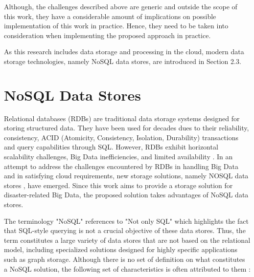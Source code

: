 Although, the challenges described above are generic and outside the scope of this work, they have a considerable amount of implications on possible implementation of this work in practice. Hence, they need to be taken into consideration when implementing the proposed approach in practice.

As this research includes data storage and processing in the cloud, modern data storage technologies, namely NoSQL data stores, are introduced in Section 2.3.

\section{NoSQL Data Stores}

Relational databases (RDBs) are traditional data storage systems designed for storing structured data. They have been used for decades dues to their reliability, consistency, ACID (Atomicity, Consistency, Isolation, Durability) transactions and query capabilities through SQL. However, RDBs exhibit horizontal scalability challenges, Big Data inefficiencies, and limited availability \cite{han2011novel}. In an attempt to address the challenges encountered by RDBs in handling Big Data and in satisfying cloud requirements, new storage solutions, namely NOSQL data stores \cite{kossmann2010data}, have emerged. Since this work aims to provide a storage solution for disaster-related Big Data, the proposed solution takes advantages of NoSQL data stores.

The terminology "NoSQL" references to "Not only SQL" which highlights the fact that SQL-style querying is not a crucial objective of these data stores. Thus, the term constitutes a large variety of data stores that are not based on the relational model, including specialized solutions designed for highly specific applications such as graph storage. Although there is no set of definition on what constitutes a NoSQL solution, the following set of characteristics is often attributed to them \cite{hecht2011nosql}
\cite{erl2013cloud} \cite{sadalage2013nosql}:


